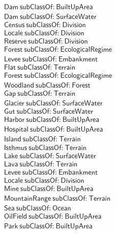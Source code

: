 \begin{align}
  \textsf{Dam}~\textsf{subClassOf:}~\textsf{BuiltUpArea}\\
  \textsf{Dam}~\textsf{subClassOf:}~\textsf{SurfaceWater}\\
  \textsf{Census}~\textsf{subClassOf:}~\textsf{Division}\\
  \textsf{Locale}~\textsf{subClassOf:}~\textsf{Division}\\
  \textsf{Reserve}~\textsf{subClassOf:}~\textsf{Division}\\
  \textsf{Forest}~\textsf{subClassOf:}~\textsf{EcologicalRegime}\\
  \textsf{Levee}~\textsf{subClassOf:}~\textsf{Embankment}\\
  \textsf{Flat}~\textsf{subClassOf:}~\textsf{Terrain}\\
  \textsf{Forest}~\textsf{subClassOf:}~\textsf{EcologicalRegime}\\
  \textsf{Woodland}~\textsf{subClassOf:}~\textsf{Forest}\\
  \textsf{Gap}~\textsf{subClassOf:}~\textsf{Terrain}\\
  \textsf{Glacier}~\textsf{subClassOf:}~\textsf{SurfaceWater}\\
  \textsf{Gut}~\textsf{subClassOf:}~\textsf{SurfaceWater}\\
  \textsf{Harbor}~\textsf{subClassOf:}~\textsf{BuiltUpArea}\\
  \textsf{Hospital}~\textsf{subClassOf:}~\textsf{BuiltUpArea}\\
  \textsf{Island}~\textsf{subClassOf:}~\textsf{Terrain}\\
  \textsf{Isthmus}~\textsf{subClassOf:}~\textsf{Terrain}\\
  \textsf{Lake}~\textsf{subClassOf:}~\textsf{SurfaceWater}\\
  \textsf{Lava}~\textsf{subClassOf:}~\textsf{Terrain}\\
  \textsf{Levee}~\textsf{subClassOf:}~\textsf{Embankment}\\
  \textsf{Locale}~\textsf{subClassOf:}~\textsf{Division}\\
  \textsf{Mine}~\textsf{subClassOf:}~\textsf{BuiltUpArea}\\
  \textsf{MountainRange}~\textsf{subClassOf:}~\textsf{Terrain}\\
  \textsf{Sea}~\textsf{subClassOf:}~\textsf{Ocean}\\
  \textsf{OilField}~\textsf{subClassOf:}~\textsf{BuiltUpArea}\\
  \textsf{Park}~\textsf{subClassOf:}~\textsf{BuiltUpArea}\\

\end{align}
